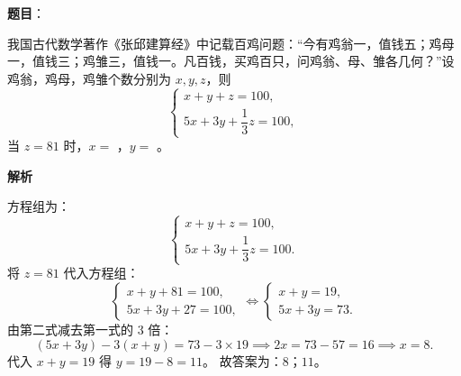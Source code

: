 \begin{answer}

\textbf{题目}：

我国古代数学著作《张邱建算经》中记载百鸡问题：“今有鸡翁一，值钱五；鸡母一，值钱三；鸡雏三，值钱一。凡百钱，买鸡百只，问鸡翁、母、雏各几何？”设鸡翁，鸡母，鸡雏个数分别为 $x, y, z$，则
\nopagebreak[4]
\[\begin{cases} x + y + z = 100, \\ 5x + 3y + \dfrac13 z = 100, \end{cases}\]
当 $z = 81$ 时，$x =$ \underline{\hspace{2cm}}，$y =$ \underline{\hspace{2cm}}。

\textbf{解析}

方程组为：
\nopagebreak[4]
\[\begin{cases} x + y + z = 100, \\ 5x + 3y + \dfrac13 z = 100. \end{cases}\]
将 $z = 81$ 代入方程组：
\nopagebreak[4]
\[\begin{cases} x + y + 81 = 100, \\ 5x + 3y + 27 = 100, \end{cases} \iff \begin{cases} x + y = 19, \\ 5x + 3y = 73. \end{cases}\]
由第二式减去第一式的 3 倍：
\nopagebreak[4]
\[(5x + 3y) - 3(x + y) = 73 - 3 \times 19 \implies 2x = 73 - 57 = 16 \implies x = 8.\]
代入 $x + y = 19$ 得 $y = 19 - 8 = 11$。
故答案为：$8$；$11$。


\end{answer}
